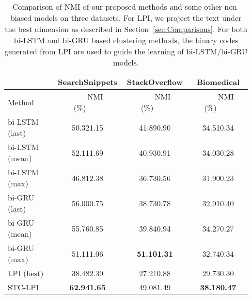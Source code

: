 \documentclass[review]{elsarticle}
\begin{document}
\begin{table*}[t] \begin{center}
\begin{tabular}{|l|c|c|c|}\hline
&SearchSnippets &StackOverflow &Biomedical\\\hline
Method      &~~~~NMI (\%)~~~~&~~~~NMI (\%)~~~~&~~~~NMI (\%)~~~~\\\hline \hline
bi-LSTM (last)& 50.321.15        & 41.890.90  & 34.510.34    \\
bi-LSTM (mean)& 52.111.69    & 40.930.91  & 34.030.28 \\
bi-LSTM (max) & 46.812.38     	&36.730.56	  &31.900.23\\
bi-GRU (last)& 56.000.75        & 38.730.78  & 32.910.40    \\
bi-GRU (mean)& 55.760.85    & 39.840.94  & 34.270.27 \\
bi-GRU (max) & 51.111.06     &	{\bf{51.101.31}}	  &32.740.34\\
\hline
LPI (best)&  38.482.39	& 27.210.88        &29.730.30\\
STC-LPI&	{\bf{62.941.65}}	& 49.081.49 &{\bf{38.180.47}}\\\hline

\end{tabular}
\end{center}
\caption{\label{tb:ComparisonNMI_BIRNN} Comparison of NMI of our proposed methods and some other non-biased models on three datasets. For LPI, we project the text under the best dimension as described in Section~\ref{sec:Comparisons}. For both bi-LSTM and bi-GRU based clustering methods, the binary codes generated from LPI are used to guide the learning of bi-LSTM/bi-GRU models.}
\end{table*}
\end{document}
